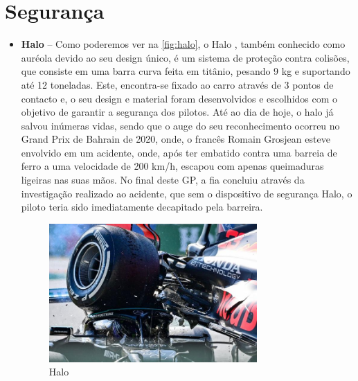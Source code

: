 \documentclass{report}
\begin{document}
\section{Segurança}	

\begin{itemize}

\item \textbf{Halo} – Como poderemos ver na \autoref{fig:halo}, o Halo \cite{halo}, também conhecido como auréola devido ao seu design único, é um sistema de proteção contra colisões, que consiste em uma barra curva feita em titânio, pesando 9 kg e suportando até 12 toneladas. Este, encontra-se fixado ao carro através de 3 pontos de contacto e, o seu design e material foram desenvolvidos e escolhidos com o objetivo de garantir a segurança dos pilotos. Até ao dia de hoje, o halo já salvou inúmeras vidas, sendo que o auge do seu reconhecimento ocorreu no Grand Prix de Bahrain de 2020, onde, o francês Romain Grosjean esteve envolvido em um acidente, onde, após ter embatido contra uma barreia de ferro a uma velocidade de 200 km/h, escapou com apenas queimaduras ligeiras nas suas mãos. 
No final deste GP, a \ac{fia} concluiu através da investigação realizado ao acidente, que sem o dispositivo de segurança Halo, o piloto teria sido imediatamente decapitado pela barreira.
\begin{figure}[h]
\center %
\includegraphics[height=150pt]{halo}
\caption{Halo}
\label{fig:halo}
\end{figure}


\end{itemize}
\end{document}
